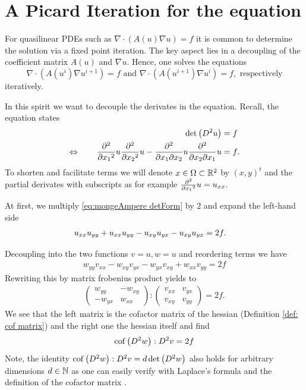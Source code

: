\section{A Picard Iteration for the \MA equation}

For quasilinear PDEs such as $\nabla \cdot (A(u) \nabla u ) = f$ it is common to determine the solution via a fixed point iteration. The key aspect lies in a decoupling of the coefficient matrix $A(u)$ and $\nabla u$. Hence, one solves the equations
\[
	\nabla \cdot (A(u^{i} )\nabla u^{i+1}) = f  \text{ and } \nabla \cdot (A(u^{i+1}) \nabla u^{i}) = f, \text{ respectively}
\] 
iteratively.

In this spirit we want to decouple the derivates in the \MA equation. Recall, the \MA equation states
\begin{align}
 \det{\left(D^2 u\right)} &= f \nonumber \\
 	\Leftrightarrow \qquad  \frac {\partial^2} {\partial {x_1}^2} u \frac {\partial^2} {\partial {x_2}^2} u -\frac {\partial^2} {\partial x_1\partial x_2} u \frac {\partial^2} {\partial x_2\partial x_1} u  &= f. \label{eq:mongeAmpere detForm}
\end{align}
To shorten and facilitate terms we will denote $x \in \Omega \subset {\mathbb{R}^2} $ by $(x,y)^t$ and the partial derivates with subscripts as for example $\frac {\partial^2} {\partial {x_1}^2} u = u_{xx}$.

At first, we multiply \eqref{eq:mongeAmpere detForm} by $2$ and expand the left-hand side
\begin{align}
 	u_{x x } u_{y y }+u_{x x } u_{y y } -u_{x y } u_{y x } -u_{x y } u_{y x } &=2 f. 
\end{align}

Decoupling into the two functions $v = u ,w = u$ and reordering terms we have
\begin{align}
	w_{yy} v_{xx}- w_{xy} v_{yx} - w_{yx} v_{xy} +w_{xx} v_{yy} = 2f \label{eq:decoupled PDE start}
\end{align}
Rewriting this by matrix frobenius product yields to
\begin{align}
 \begin{pmatrix} w_{yy} & -w_{xy}  \\ -w_{yx} & w_{xx} \end{pmatrix}: \begin{pmatrix} v_{xx} & v_{yx}  \\  v_{xy} & v_{yy} \end{pmatrix} = 2f.
\end{align}
We see that the left matrix is the cofactor matrix of the hessian (Definition \ref{def: cof matrix}) and the right one the hessian itself and find
\begin{align}
		\operatorname{cof} \left( D^2 w  \right):D^2 v  = 2f  \label{eq:short formula}
\end{align}
Note, the identity $\operatorname{cof} \left( D^2 w  \right):D^2 v  = d \det{\left(D^2 w\right)}$ also holds for arbitrary dimensions $d \in \mathbb{N}$ as one can easily verify with Laplace's formula and the definition of the cofactor matrix . 

